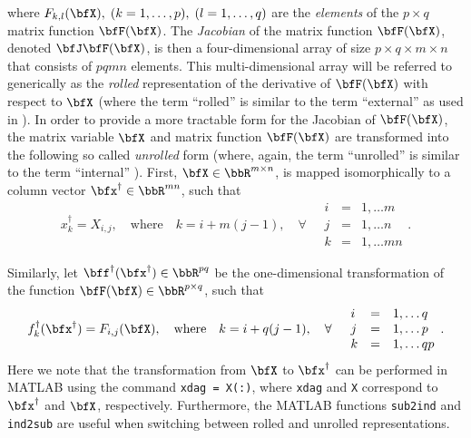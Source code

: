 \documentclass[10pt,pdftex]{article}
\begin{document}
where $F_{k,l}(\bfX),\;(k=1,\ldots,p),\;(l=1,\ldots,q)$ are the 
{\em elements} of the $p\times q$ matrix function $\bfF(\bfX)$.  
The {\em Jacobian} of the matrix function $\bfF(\bfX)$, denoted
$\bfJ\bfF(\bfX)$, is then a four-dimensional array of size $p\times
q\times m\times n$ that consists of $pqmn$ elements.  This
multi-dimensional array will be referred to generically as the 
{\em rolled} representation of the derivative of $\bfF(\bfX)$ with
respect to $\bfX$ (where the term ``rolled'' is similar to the term
``external'' as used in \cite{Forth1}).  In order to provide a more tractable form for
the Jacobian of $\bfF(\bfX)$, the matrix variable $\bfX$ and matrix
function $\bfF(\bfX)$ are transformed into the following so called 
{\em unrolled} form (where, again, the term ``unrolled'' is similar to
the term ``internal'' \cite{Forth1}).  First, $\bfX\in\bbR^{m\times n}$, is mapped
isomorphically to a column vector $\bfx^\dag\in\bbR^{mn}$, such that
\begin{equation}\label{general-vector-xdag}
  x^\dag _k = X_{i,j}, \quad \text{where} \quad k = i+m(j-1),\quad \forall \quad \begin{array}{lll}
  i & = & 1,\dots m \\
  j & = & 1,\dots n \\
  k & = & 1,\dots mn
  \end{array}.
\end{equation}


Similarly, let
$\bff^\dag(\bfx^{\dag})\in\bbR^{pq}$ be the one-dimensional
transformation of the function $\bfF(\bfX)\in\bbR^{p\times q}$, such that 
\begin{equation}\label{general-function-fdag}
  f^\dag _k(\bfx^\dag) = F_{i,j}(\bfX), \quad \text{where} \quad k = i+q(j-1),\quad \forall \quad \begin{array}{lll}
  i & = & 1,\dots q \\
  j & = & 1,\dots p \\
  k & = & 1,\dots qp
  \end{array}.
\end{equation}
Here we note that the transformation from $\bfX$ to $\bfx^\dag$ can be performed in MATLAB using the command \texttt{xdag = X(:)}, where \texttt{xdag} and \texttt{X} correspond to $\bfx^\dag$ and $\bfX$, respectively. Furthermore, the MATLAB functions \texttt{sub2ind} and \texttt{ind2sub} are useful when switching between rolled and unrolled representations.
\end{document}
